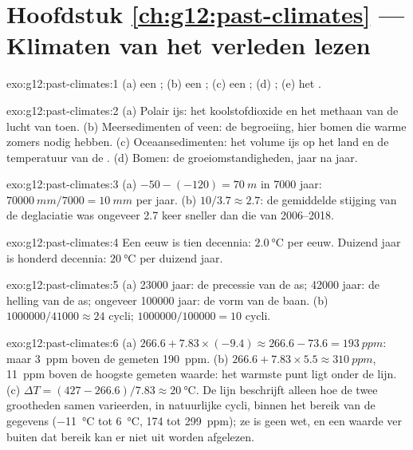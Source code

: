 \section*{Hoofdstuk \ref{ch:g12:past-climates} --- Klimaten van het verleden lezen}

\begin{solution}{exo:g12:past-climates:1}
(a) een ; (b) een ; (c) een ; (d) ;
(e) het .
\end{solution}

\begin{solution}{exo:g12:past-climates:2}
(a) Polair ijs: het koolstofdioxide en het methaan van de lucht van toen.
(b) Meersedimenten of veen: de begroeiing, hier bomen die warme
zomers nodig hebben. (c) Oceaansedimenten: het volume ijs op het land en de temperatuur
van de . (d) Bomen: de groeiomstandigheden, jaar na jaar.
\end{solution}

\begin{solution}{exo:g12:past-climates:3}
(a) $-50 - (-120) = \qty{70}{m}$ in \num{7000} jaar: $\qty{70000}{mm}/\num{7000}
= \qty{10}{mm}$ per jaar. (b) $10/3.7 \approx 2.7$: de gemiddelde stijging van de
deglaciatie was ongeveer 2.7 keer sneller dan die van 2006--2018.
\end{solution}

\begin{solution}{exo:g12:past-climates:4}
Een eeuw is tien decennia: $\qty{2.0}{\degreeCelsius}$ per eeuw. Duizend
jaar is honderd decennia: $\qty{20}{\degreeCelsius}$ per duizend jaar.
\end{solution}

\begin{solution}{exo:g12:past-climates:5}
(a) \num{23000} jaar: de precessie van de as; \num{42000} jaar: de
helling van de as; ongeveer \num{100000} jaar: de vorm van de baan.
(b) $\num{1000000}/\num{41000} \approx 24$ cycli; $\num{1000000}/\num{100000}
= 10$ cycli.
\end{solution}

\begin{solution}{exo:g12:past-climates:6}
(a) $266.6 + 7.83 \times (-9.4) \approx 266.6 - 73.6 = \qty{193}{ppm}$: maar
\qty{3}{ppm} boven de gemeten \qty{190}{ppm}. (b) $266.6 + 7.83 \times 5.5
\approx \qty{310}{ppm}$, \qty{11}{ppm} boven de hoogste gemeten waarde: het
warmste punt ligt onder de lijn. (c) $\Delta T = (427 - 266.6)/7.83 \approx
\qty{20}{\degreeCelsius}$. De lijn beschrijft alleen hoe de twee grootheden
samen varieerden, in natuurlijke cycli, binnen het bereik van de gegevens
(\qty{-11}{\degreeCelsius} tot \qty{+6}{\degreeCelsius}, 174 tot
\qty{299}{ppm}); ze is geen wet, en een waarde ver buiten dat bereik kan
er niet uit worden afgelezen.
\end{solution}

